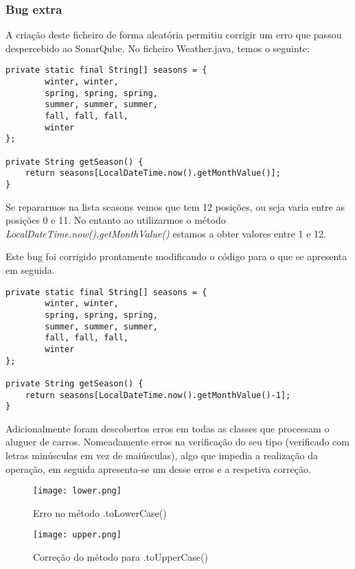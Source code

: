 \subsubsection{Bug extra}\hfill
\newline
\par A criação deste ficheiro de forma aleatória permitiu corrigir um erro que passou despercebido ao SonarQube. No ficheiro Weather.java, temos o seguinte:\newline
\hfill\newline

\begin{lstlisting}
private static final String[] seasons = {
        winter, winter,
        spring, spring, spring,
        summer, summer, summer,
        fall, fall, fall,
        winter
};

private String getSeason() {
    return seasons[LocalDateTime.now().getMonthValue()];
}
\end{lstlisting}
\hfill\newline
\par Se repararmos na lista seasons vemos que tem 12 posições, ou seja varia entre as posições 0 e 11.
No entanto ao utilizarmos o método \textit{LocalDateTime.now().getMonthValue()} estamos a obter valores entre 1 e 12.\newline
\par Este bug foi corrigido prontamente modificando o código para o que se apresenta em seguida.\newline
\hfill\newline
\begin{lstlisting}
private static final String[] seasons = {
        winter, winter,
        spring, spring, spring,
        summer, summer, summer,
        fall, fall, fall,
        winter
};

private String getSeason() {
    return seasons[LocalDateTime.now().getMonthValue()-1];
}
\end{lstlisting}
\hfill\newline


\par Adicionalmente foram descobertos erros em todas as classes que processam o aluguer de carros. Nomeadamente erros na verificação do seu tipo (verificado com letras minúsculas em vez de maiúsculas), algo que impedia a realização da operação, em seguida apresenta-se um desse erros e a respetiva correção.

\begin{figure}[H]
  \centering

  \texttt{[image: lower.png]}

  \caption {Erro no método .toLowerCase()}

  \label {fig47}
\end{figure}
\begin{figure}[H]
  \centering

  \texttt{[image: upper.png]}

  \caption {Correção do método para .toUpperCase()}

  \label {fig48}
\end{figure}



\newpage







